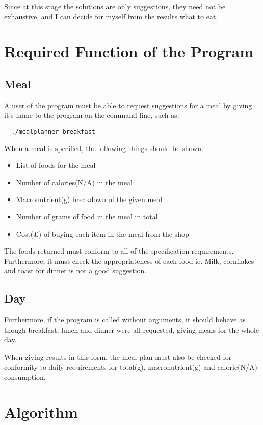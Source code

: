 \documentclass[a4paper]{article}
\begin{document}
Since at this stage the solutions are only suggestions, they need not be 
exhaustive, and I can decide for myself from the results what to eat.

\section{Required Function of the Program}

\subsection{Meal}

A user of the program must be able to request suggestions for a meal by giving it's name 
to the program on the command line, such as:

\begin{verbatim}
  ./mealplanner breakfast
\end{verbatim}

When a meal is specified, the following things should be shown:

\begin{itemize}
  \item List of foods for the meal
  \item Number of calories(N/A) in the meal
  \item Macronutrient(g) breakdown of the given meal
  \item Number of grams of food in the meal in total
  \item Cost(£) of buying each item in the meal from the shop
\end{itemize}

The foods returned must conform to all of the specification 
requirements. Furthermore, it must check the appropriateness of each 
food ie. Milk, cornflakes and toast for dinner is not a good suggestion.

\subsection{Day}

Furthermore, if the program is called without arguments, it should 
behave as though breakfast, lunch and dinner were all requested, giving 
meals for the whole day.

When giving results in this form, the meal plan must also be checked for 
conformity to daily requirements for total(g), macronutrient(g) and 
calorie(N/A) consumption.

\section{Algorithm}
\end{document}
